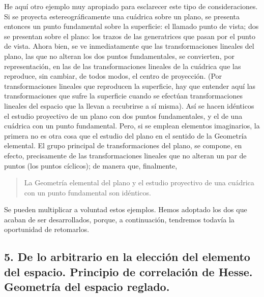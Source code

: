 \documentclass[a4paper, 12pt]{article}
\begin{document}
He aquí otro ejemplo muy apropiado para esclarecer este tipo de consideraciones. Si se proyecta estereográficamente una cuádrica sobre un plano, se presenta entonces un punto fundamental sobre la superficie: el llamado punto de vista; dos se presentan sobre el plano: los trazos de las generatrices que pasan por el punto de vista. Ahora bien, se ve inmediatamente que las transformaciones lineales del plano, las que no alteran los dos puntos fundamentales, se convierten, por representación, en las de las transformaciones lineales de la cuádrica que las reproduce, sin cambiar, de todos modos, el centro de proyección. (Por transformaciones lineales que reproducen la superficie, hay que entender aquí las transformaciones que sufre la superficie cuando se efectúan transformaciones lineales del espacio que la llevan a recubrirse a sí misma). Así se hacen idénticos el estudio proyectivo de un plano con dos puntos fundamentales, y el de una cuádrica con un punto fundamental. Pero, si se emplean elementos imaginarios, la primera no es otra cosa que el estudio del plano en el sentido de la Geometría elemental. El grupo principal de transformaciones del plano, se compone, en efecto, precisamente de las transformaciones lineales que no alteran un par de puntos (los puntos cíclicos); de manera que, finalmente,

\begin{quote}\it 

La Geometría elemental del plano y el estudio proyectivo de una cuádrica con un punto fundamental son idénticos.

\end{quote}

Se pueden multiplicar a voluntad estos ejemplos. Hemos adoptado los dos que acaban de ser desarrollados, porque, a continuación, tendremos todavía la oportunidad de retomarlos. 



\subsection*{5. De lo arbitrario en la elección del elemento del espacio. Principio de correlación de Hesse. Geometría del espacio reglado.} 
\end{document}

